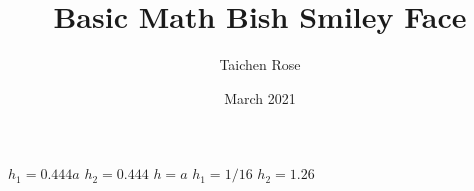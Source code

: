 \documentclass{article}
\title{Basic Math Bish Smiley Face}
\author{Taichen Rose}
\date{March 2021}
\begin{document}
$h_{1}= 0.444a$
$h_{2}= 0.444$
$h = a$
$h_{1} = 1/16$
$h_{2} = 1.26$
\end{document}
